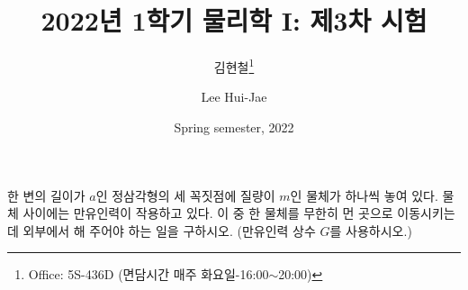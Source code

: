 \documentclass[floatfix,nofootinbib,superscriptaddress,fleqn]{revtex4-2}
\begin{document}
\title{\Large 2022년 1학기 물리학 I: 제3차 시험}
\author{김현철\footnote{Office: 5S-436D (면담시간 매주
    화요일-16:00$\sim$20:00)}} 
\author{Lee Hui-Jae} 
\date{Spring semester, 2022}


\maketitle
 
한 변의 길이가 $a$인 정삼각형의 세 꼭짓점에 질량이 $m$인 물체가 하나씩 놓여 있다. 
물체 사이에는 만유인력이 작용하고 있다. 이 중 한 물체를 무한히 먼 곳으로 이동시키는 데 
외부에서 해 주어야 하는 일을 구하시오. (만유인력 상수 $G$를 사용하시오.) 

\vspace{1cm}

\vspace{1cm} 

\vspace{1cm}

\vspace{1cm} 

\vspace{1cm}

\vspace{1cm} 

\vspace{1cm}

\vspace{1cm} 

\vspace{1cm}

\vspace{1cm} 

\vspace{1cm}

\vspace{1cm} 

\vspace{1cm}

\vspace{1cm} 
\end{document}
